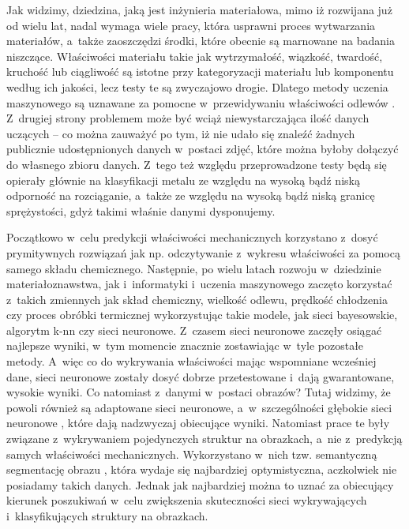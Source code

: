 Jak widzimy, dziedzina, jaką jest inżynieria materiałowa, mimo iż rozwijana już od wielu lat, nadal wymaga wiele pracy, która usprawni proces wytwarzania materiałów, a~także zaoszczędzi środki, które obecnie są marnowane na badania niszczące. Właściwości materiału takie jak wytrzymałość, wiązkość, twardość, kruchość lub ciągliwość są istotne przy kategoryzacji materiału lub komponentu według ich jakości, lecz testy te są zwyczajowo drogie. Dlatego metody uczenia maszynowego są uznawane za pomocne w~przewidywaniu właściwości odlewów \cite{Stoll21}. Z~drugiej strony problemem może być wciąż niewystarczająca ilość danych uczących –  co można zauważyć po tym, iż nie udało się znaleźć żadnych publicznie udostępnionych danych w~postaci zdjęć, które można byłoby dołączyć do własnego zbioru danych. Z~tego też względu przeprowadzone testy będą się opierały głównie na klasyfikacji metalu ze względu na wysoką bądź niską odporność na rozciąganie, a~także ze względu na wysoką bądź niską granicę sprężystości, gdyż takimi właśnie danymi dysponujemy.

Początkowo w~celu predykcji właściwości mechanicznych korzystano z~dosyć prymitywnych rozwiązań jak np. odczytywanie z~wykresu właściwości za pomocą samego składu chemicznego. Następnie, po wielu latach rozwoju w~dziedzinie materiałoznawstwa, jak i~informatyki i~uczenia maszynowego zaczęto korzystać z~takich zmiennych jak skład chemiczny, wielkość odlewu, prędkość chłodzenia czy proces obróbki termicznej wykorzystując takie modele, jak sieci bayesowskie, algorytm k-nn czy sieci neuronowe. Z~czasem sieci neuronowe zaczęły osiągać najlepsze wyniki, w~tym momencie znacznie zostawiając w~tyle pozostałe metody. A~więc co do wykrywania właściwości mając wspomniane wcześniej dane, sieci neuronowe zostały dosyć dobrze przetestowane i~dają gwarantowane, wysokie wyniki. Co natomiast z~danymi w~postaci obrazów? Tutaj widzimy, że powoli również są adaptowane sieci neuronowe, a~w~szczególności głębokie sieci neuronowe \cite{Azimi18, Pauly16}, które dają nadzwyczaj obiecujące wyniki. Natomiast prace te były związane z~wykrywaniem pojedynczych struktur na obrazkach, a~nie z~predykcją samych właściwości mechanicznych. Wykorzystano w~nich tzw. semantyczną segmentację obrazu \cite{Azimi18, Pauly16}, która wydaje się najbardziej optymistyczna, aczkolwiek nie posiadamy takich danych. Jednak jak najbardziej można to uznać za obiecujący kierunek poszukiwań w~celu zwiększenia skuteczności sieci wykrywających i~klasyfikujących struktury na obrazkach.

